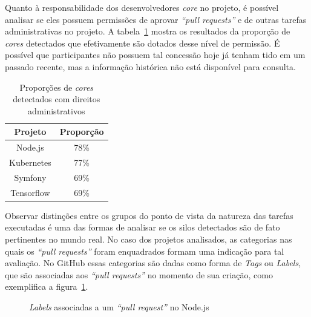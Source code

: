 \documentclass[12pt,openany,oneside,a4paper,english,brazil]{abntbibufjf}
\begin{document}
  Quanto à responsabilidade dos desenvolvedores \textit{core} no projeto, é possível analisar se eles possuem permissões de aprovar \textit{``pull requests''} e de outras tarefas administrativas no projeto. A tabela~\ref{tab:prop-core-users} mostra os resultados da proporção de \textit{cores} detectados que efetivamente são dotados desse nível de permissão. É possível que participantes não possuem tal concessão hoje já tenham tido em um passado recente, mas a informação histórica não está disponível para consulta.

  \begin{table}[htbp]
  \caption{Proporções de \textit{cores} detectados com direitos administrativos}
  \begin{center}
  \begin{tabular}{|c|c|}
  \hline
  \textbf{Projeto} & \textbf{Proporção} \\
  \hline
  Node.js    & 78\%      \\
  Kubernetes & 77\%      \\
  Symfony    & 69\%      \\
  Tensorflow & 69\%      \\ \hline
  \end{tabular}
  \label{tab:prop-core-users}
  \end{center}
  \end{table}

Observar distinções entre os grupos do ponto de vista da natureza das tarefas executadas é uma das formas de analisar se os silos detectados são de fato pertinentes no mundo real. No caso dos projetos analisados, as categorias nas quais os \textit{``pull requests''} foram enquadrados formam uma indicação para tal avaliação. No GitHub essas categorias são dadas como forma de \textit{Tags} ou \textit{Labels}, que são associadas aos \textit{``pull requests''} no momento de sua criação, como exemplifica a figura~\ref{fig:labels}.


  \begin{figure}[htbp]
    \centerline{}
    \caption{\textit{Labels} associadas a um \textit{``pull request''} no Node.js}
    \label{fig:labels}
  \end{figure}
\end{document}
